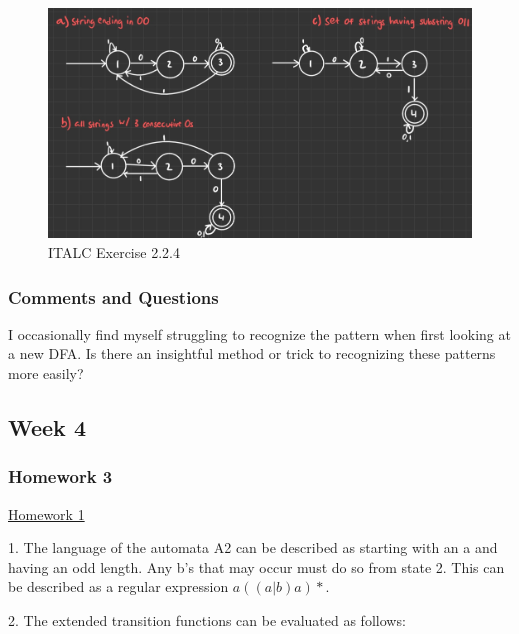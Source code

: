 \documentclass{article}
\theoremstyle{theorem}
\theoremstyle{definition}
\theoremstyle{remark}
\begin{document}
\begin{figure}
  \begin{center}
\includegraphics[scale=0.2]{attachments/LabExercise4_2.jpg}
\end{center}
\caption{ITALC Exercise 2.2.4}
\end{figure}

\subsubsection*{Comments and Questions}

I occasionally find myself struggling to recognize the pattern when first looking at a new DFA. Is there an insightful method or trick to recognizing these patterns more easily?

\subsection{Week 4}


\subsubsection*{Homework 3}

\underline{Homework 1}

1. The language of the automata A2 can be described as starting with an a and having an odd length. Any b's that may occur must do so from state 2. This can be described as a regular expression $a((a|b)a)*$.

2. The extended transition functions can be evaluated as follows:
\end{document}
